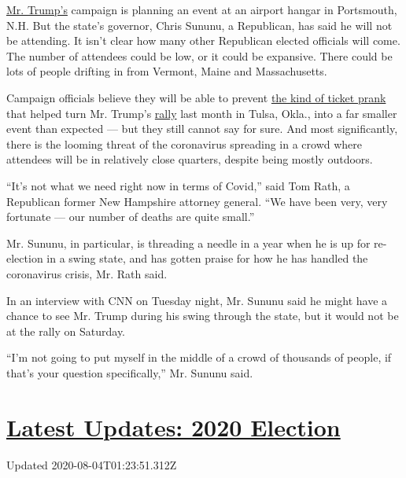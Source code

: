 \href{https://www.nytimes.com/2020/07/10/us/politics/trump-nh-rally-postponed.html}{Mr.
Trump's} campaign is planning an event at an airport hangar in
Portsmouth, N.H. But the state's governor, Chris Sununu, a Republican,
has said he will not be attending. It isn't clear how many other
Republican elected officials will come. The number of attendees could be
low, or it could be expansive. There could be lots of people drifting in
from Vermont, Maine and Massachusetts.

Campaign officials believe they will be able to prevent
\href{https://www.nytimes.com/2020/06/21/us/politics/trump-tulsa-rally.html}{the
kind of ticket prank} that helped turn Mr. Trump's
\href{https://www.nytimes.com/2020/07/10/us/politics/trump-nh-rally-postponed.html}{rally}
last month in Tulsa, Okla., into a far smaller event than expected ---
but they still cannot say for sure. And most significantly, there is the
looming threat of the coronavirus spreading in a crowd where attendees
will be in relatively close quarters, despite being mostly outdoors.

``It's not what we need right now in terms of Covid,'' said Tom Rath, a
Republican former New Hampshire attorney general. ``We have been very,
very fortunate --- our number of deaths are quite small.''

Mr. Sununu, in particular, is threading a needle in a year when he is up
for re-election in a swing state, and has gotten praise for how he has
handled the coronavirus crisis, Mr. Rath said.

In an interview with CNN on Tuesday night, Mr. Sununu said he might have
a chance to see Mr. Trump during his swing through the state, but it
would not be at the rally on Saturday.

``I'm not going to put myself in the middle of a crowd of thousands of
people, if that's your question specifically,'' Mr. Sununu said.

\hypertarget{latest-updates-2020-election}{%
\section{\texorpdfstring{\href{https://www.nytimes.com/2020/08/03/us/elections/biden-vs-trump.html?action=click\&pgtype=Article\&state=default\&region=MAIN_CONTENT_1\&context=storylines_live_updates}{Latest
Updates: 2020
Election}}{Latest Updates: 2020 Election}}\label{latest-updates-2020-election}}

Updated 2020-08-04T01:23:51.312Z

